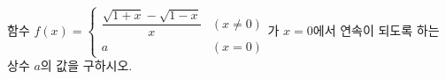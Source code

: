 함수 $f(x)=\begin{cases} \dfrac{\sqrt{1+x}-\sqrt{1-x}}{x} & (x\ne 0) \\ a & (x=0) \end{cases}$가 $x=0$에서 연속이 되도록 하는 상수 $a$의 값을 구하시오.

